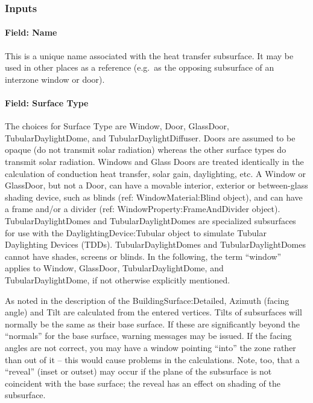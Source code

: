 \subsubsection{Inputs}\label{inputs-24-004}

\paragraph{Field: Name}\label{field-name-20-004}

This is a unique name associated with the heat transfer subsurface. It may be used in other places as a reference (e.g.~as the opposing subsurface of an interzone window or door).

\paragraph{Field: Surface Type}\label{field-surface-type-2016-06-16}

The choices for Surface Type are Window, Door, GlassDoor, TubularDaylightDome, and TubularDaylightDiffuser. Doors are assumed to be opaque (do not transmit solar radiation) whereas the other surface types do transmit solar radiation. Windows and Glass Doors are treated identically in the calculation of conduction heat transfer, solar gain, daylighting, etc. A Window or GlassDoor, but not a Door, can have a movable interior, exterior or between-glass shading device, such as blinds (ref: WindowMaterial:Blind object), and can have a frame and/or a divider (ref: WindowProperty:FrameAndDivider object). TubularDaylightDomes and TubularDaylightDomes are specialized subsurfaces for use with the DaylightingDevice:Tubular object to simulate Tubular Daylighting Devices (TDDs). TubularDaylightDomes and TubularDaylightDomes cannot have shades, screens or blinds. In the following, the term ``window'' applies to Window, GlassDoor, TubularDaylightDome, and TubularDaylightDome, if not otherwise explicitly mentioned.

As noted in the description of the BuildingSurface:Detailed, Azimuth (facing angle) and Tilt are calculated from the entered vertices. Tilts of subsurfaces will normally be the same as their base surface. If these are significantly beyond the ``normals'' for the base surface, warning messages may be issued. If the facing angles are not correct, you may have a window pointing ``into'' the zone rather than out of it -- this would cause problems in the calculations. Note, too, that a ``reveal'' (inset or outset) may occur if the plane of the subsurface is not coincident with the base surface; the reveal has an effect on shading of the subsurface.

